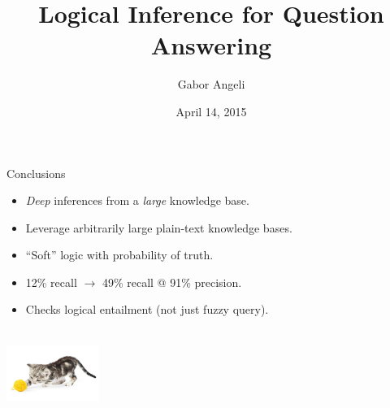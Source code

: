\documentclass[hyperref]{beamer}
\title{Logical Inference for Question Answering}
\subtitle{}
\author{Gabor Angeli}
\date{April 14, 2015}
\institute[Stanford]{Stanford University}
\begin{document}
\begin{frame}[noframenumbering]
  \titlepage
\end{frame}




%



\begin{frame}{Conclusions}
\begin{itemize}
  \item \textit{Deep} inferences from a \textit{large} knowledge base.
  \item Leverage arbitrarily large plain-text knowledge bases.
  \item ``Soft'' logic with probability of truth.
\end{itemize}
\vspace{0.5cm}
\pause

\begin{itemize}
  \item 12\% recall $\rightarrow$ 49\% recall @ 91\% precision.
  \item Checks logical entailment (not just fuzzy query).
\end{itemize}
\vspace{0.25cm}
\pause

\end{frame}

\begin{frame}[noframenumbering]{}
\begin{center}
   \\
  \vspace{1cm}
  \includegraphics[width=3cm]{../img/yarn-cat.jpg} \\
\end{center}
\end{frame}
\end{document}

